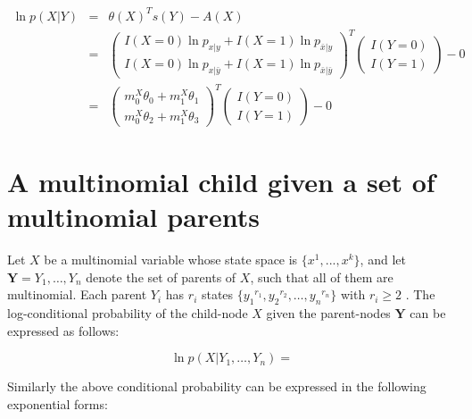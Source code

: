 \documentclass[11pt, oneside]{article}   	%
\numberwithin{figure}{section}
\numberwithin{equation}{section}
\numberwithin{table}{section}
\begin{document}
\begin{itemize}
\begin{eqnarray*}
\ln p(X|Y) &=& \theta(X)^T s(Y) - A(X) \\
&=&
\begin{pmatrix}
I(X=0)\ln p_{x|y}  + I(X=1)\ln p_{\bar{x}|y}\\
I(X=0)\ln p_{x|\bar{y}}  + I(X=1)\ln p_{\bar{x}|\bar{y}}
\end{pmatrix}^T
\begin{pmatrix}
I(Y=0) \\
I(Y=1)
\end{pmatrix}
- 0\\
&=&
\begin{pmatrix}
m^X_0\theta_0  +  m^X_1\theta_1\\
m^X_0\theta_2  + m^X_1\theta_3
\end{pmatrix}^T
\begin{pmatrix}
I(Y=0) \\
I(Y=1)
\end{pmatrix}
- 0
\end{eqnarray*}

\end{itemize}

\newpage
\section{A multinomial child given a set of multinomial parents}

Let $X$ be a multinomial variable whose state space is $\{x^1,...,x^k\}$, and let $\mathbf{Y} =Y_1,\ldots,Y_n$ denote the set of parents of $X$, such that all of them are multinomial. Each parent $Y_i$ has $r_i$ states $\{ {y_1}^{r_1}, {y_2}^{r_2},\ldots, {y_n}^{r_n} \}$ with $r_i \geq 2$ . The log-conditional probability of the child-node $X$ given the parent-nodes $\mathbf{Y}$ can be expressed as follows:

$$ \ln p(X|Y_1,\ldots,Y_n) = $$

Similarly the above conditional probability can be expressed in the following exponential forms:
\end{document}
